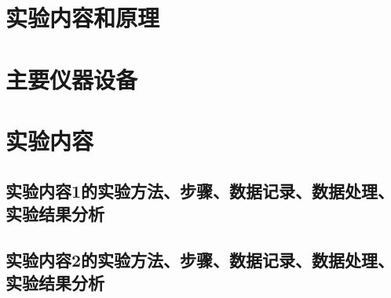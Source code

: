 \documentclass[UTF8]{ctexart}
\begin{document}
\subsection{}
\subsection{}

\section{实验内容和原理}
\subsection{}
\subsection{}
\subsection{}

\section{主要仪器设备}

\subsection{}

\subsection{}

\subsection{}

\section{实验内容}

\subsection{实验内容1的实验方法、步骤、数据记录、数据处理、实验结果分析}

\subsection{实验内容2的实验方法、步骤、数据记录、数据处理、实验结果分析}
\end{document}
